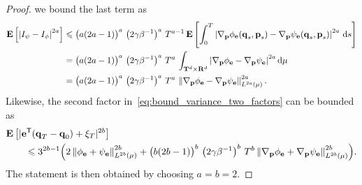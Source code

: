 \documentclass[11pt,a4paper]{article}
\begin{document}
\begin{proof}
    we bound the last term as
    \begin{align*}
        \expect \left[ \abs{I_{\psi} - I_{\phi}}^{2 a} \right]
        &\leq \bigl( a(2 a - 1)\bigr)^a \, \left(2 \gamma \beta^{-1}\right)^a \,  T^{a-1} \,
        \expect \left[ \int_{0}^{T} \abs{\grad_{\vect p} \phi_{\vect e}(\vect q_s, \vect p_s) - \grad_{\vect p} \psi_{\vect e}(\vect q_s, \vect p_s)}^{2a} \, \d s\right] \\
        &= \bigl(a(2a - 1)\bigr)^a \, \left(2 \gamma \beta^{-1}\right)^a \,  T^{a} \, \int_{\torus^d \times \real^d} \abs{\grad_{\vect p} \phi_{\vect e} - \grad_{\vect p} \psi_{\vect e}}^{2a} \d \mu \\
        &= \bigl(a(2a - 1)\bigr)^a \, \left(2 \gamma \beta^{-1}\right)^a \,  T^{a} \, \norm{\grad_{\vect p} \phi_{\vect e} - \grad_{\vect p} \psi_{\vect e}}_{L^{2a}(\mu)}^{2a}.
    \end{align*}
    Likewise, the second factor in~\eqref{eq:bound_variance_two_factors} can be bounded as
    \begin{align*}
        &\expect \left[ |\vect e^\t(\vect q_T - \vect q_0) + \xi_T|^{2b} \right] \\
        &\qquad
        \leq 3^{2b-1} \Bigl( 2 \norm{\phi_{\vect e} + \psi_{\vect e}}[L^{2b}(\mu)]^{2b}
        + \bigl(b(2b - 1)\bigr)^b \, \left(2 \gamma \beta^{-1}\right)^b \, T^{b} \norm{\grad_{\vect p} \phi_{\vect e} + \grad_{\vect p} \psi_{\vect e}}[L^{2b}(\mu)]^{2b} \Bigr).
    \end{align*}
    The statement is then obtained by choosing $a = b = 2$.
\end{proof}
\end{document}
